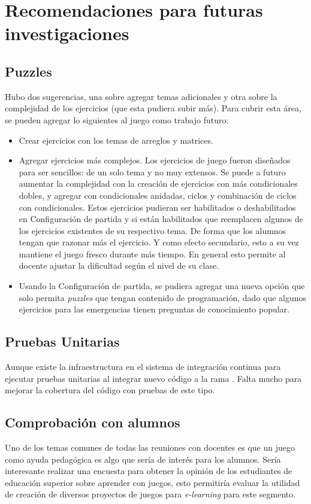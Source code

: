 \section{Recomendaciones para futuras investigaciones}
\subsection{Puzzles}
Hubo dos sugerencias, una sobre agregar temas adicionales y otra sobre la complejidad de los ejercicios (que esta pudiera subir más). Para cubrir esta área, se pueden agregar lo siguientes al juego como trabajo futuro:
\begin{itemize}
    \item Crear ejercicios con los temas de arreglos y matrices.
    
    \item Agregar ejercicios más complejos. Los ejercicios de juego fueron diseñados para ser sencillos: de un solo tema y no muy extensos. Se puede a futuro aumentar la complejidad con la creación de ejercicios con más condicionales dobles, y agregar  con condicionales anidadas, ciclos y combinación de ciclos con condicionales. Estos ejercicios pudieran ser habilitados o deshabilitados en Configuración de partida y si están habilitados que reemplacen algunos de los ejercicios existentes de su respectivo tema. De forma que los alumnos tengan que razonar más el ejercicio. Y como efecto secundario, esto a su vez mantiene el juego fresco durante más tiempo. En general esto permite al docente ajustar la dificultad según el nivel de su clase.
    
    \item Usando la Configuración de partida, se pudiera agregar una nueva opción que solo permita \textit{puzzles} que tengan contenido de programación, dado que algunos ejercicios para las emergencias tienen preguntas de conocimiento popular.
\end{itemize}

\subsection{Pruebas Unitarias}
Aunque existe la infraestructura en el sistema de integración continua para ejecutar pruebas unitarias al integrar nuevo código a la rama . Falta mucho para mejorar la cobertura del código con pruebas de este tipo. 

\subsection{Comprobación con alumnos}
Uno de los temas comunes de todas las reuniones con docentes es que un juego como ayuda pedagógica es algo que sería de interés para los alumnos. Sería interesante realizar una encuesta para obtener la opinión de los estudiantes de educación superior sobre aprender con juegos, esto permitiría evaluar la utilidad de creación de diversos proyectos de juegos para \textit{e-learning} para este segmento. 

